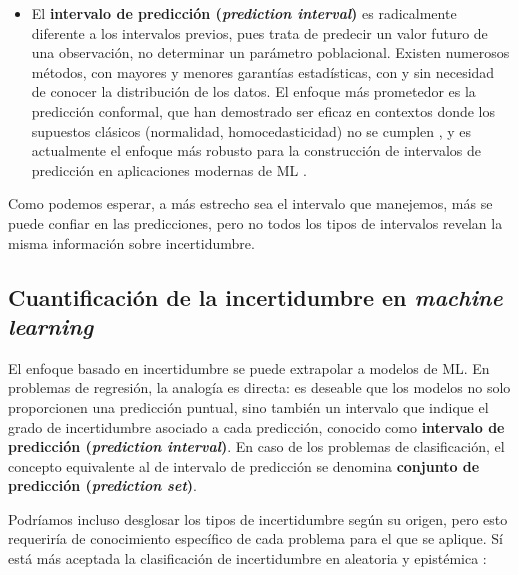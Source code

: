\begin{itemize}
    \item El \textbf{intervalo de predicción (\textit{prediction interval})} es radicalmente diferente a los 
    intervalos previos, pues trata de predecir un valor futuro de una observación, no determinar un parámetro 
    poblacional. Existen numerosos métodos, con mayores y menores garantías estadísticas, con y sin 
    necesidad de conocer la distribución de los datos. El enfoque más prometedor es la predicción conformal, 
    que han demostrado ser eficaz en contextos donde los supuestos clásicos (normalidad, homocedasticidad) no 
    se cumplen \cite{romano2019}, y es actualmente el enfoque más robusto para la construcción de intervalos 
    de predicción en aplicaciones modernas de ML 
    \cite{romano2019, luo2025, sadinle2019, romano2020, angelopoulos2020}.

\end{itemize}

Como podemos esperar, a más estrecho sea el intervalo que manejemos, más se puede confiar en las predicciones,
pero no todos los tipos de intervalos revelan la misma información sobre incertidumbre. 


\subsection{Cuantificación de la incertidumbre en \textit{machine learning}}

El enfoque basado en incertidumbre se puede extrapolar a modelos de ML. En problemas de regresión, la analogía
es directa: es deseable que los modelos no solo proporcionen una predicción puntual, sino también un intervalo 
que indique el grado de incertidumbre asociado a cada predicción, conocido como \textbf{intervalo de 
predicción (\textit{prediction interval})}. En caso de los problemas de clasificación, el concepto equivalente 
al de intervalo de predicción se denomina \textbf{conjunto de predicción (\textit{prediction set})}.


Podríamos incluso desglosar los tipos de incertidumbre según su origen, pero esto requeriría de conocimiento
específico de cada problema para el que se aplique. Sí está más aceptada la clasificación de incertidumbre en
aleatoria y epistémica \cite{hullermeier2021}:

